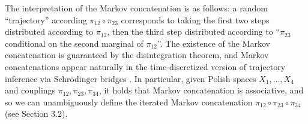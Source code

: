 \documentclass[twoside,11pt]{article}
\begin{document}
The interpretation
of the Markov concatenation is as follows: a random ``trajectory'' according
$\pi_{12}\circ\pi_{23}$ corresponds to taking the first two steps
distributed according to $\pi_{12}$, then the third step distributed
according to ``$\pi_{23}$ conditional on the second marginal of
$\pi_{12}$''. The existence of the Markov concatenation is guaranteed
by the disintegration theorem, and Markov concatenations appear naturally
in the time-discretized version of trajectory inference via Schr\"odinger
bridges \citep{lavenant2021towards}. In particular, given Polish spaces $X_1,\ldots,X_4$ and couplings $\pi_{12},\pi_{23},\pi_{34}$, it holds that Markov concatenation is associative, and so we can unambiguously define the iterated Markov concatenation $\pi_{12}\circ\pi_{23}\circ\pi_{34}$ (see \citet{benamou2019entropy} Section 3.2).
\end{document}
